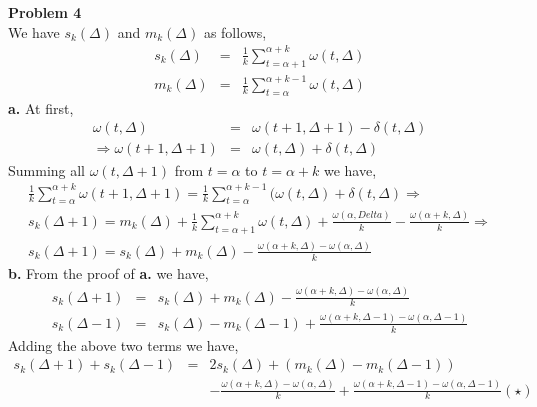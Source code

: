 


\noindent
{\bf Problem 4}\\

We have $s_k(\Delta)$ and $m_k(\Delta)$ as follows,\\
\begin{eqnarray*}
s_k(\Delta) &=& \frac{1}{k}\sum_{t=\alpha+1}^{\alpha+k}\omega(t,\Delta) \\
m_k(\Delta) &=& \frac{1}{k}\sum_{t=\alpha}^{\alpha+k-1}\omega(t,\Delta)
\end{eqnarray*}
{\bf a.} At first,\\
\begin{eqnarray*}
  \omega(t,\Delta) &=& \omega(t+1,\Delta+1) - \delta(t,\Delta) \\
  \Rightarrow \omega(t+1,\Delta+1) &=& \omega(t,\Delta) + \delta(t,\Delta)
\end{eqnarray*}
Summing all $\omega(t, \Delta+1)$ from $t=\alpha$ to $t=\alpha+k$ we have, \\
\begin{eqnarray*}
  \frac{1}{k}\sum_{t=\alpha}^{\alpha+k}\omega(t+1,\Delta+1) = \frac{1}{k}
  \sum_{t=\alpha}^{\alpha+k-1}(\omega(t,\Delta) + \delta(t,\Delta) \Rightarrow \\
  s_k(\Delta+1) = m_k(\Delta) + \frac{1}{k}\sum_{t=\alpha+1}^{\alpha+k}
  \omega(t,\Delta) + \frac{\omega(\alpha, Delta)}{k} - \frac{\omega(\alpha+k,\Delta)}{k} \Rightarrow\\
  s_k(\Delta+1) = s_k(\Delta) + m_k(\Delta) - \frac{\omega(\alpha+k,\Delta)
  -\omega(\alpha, \Delta)}{k}
\end{eqnarray*}
{\bf b.} From the proof of {\bf a.} we have,\\
\begin{eqnarray*}
  s_k(\Delta+1) &=& s_k(\Delta) + m_k(\Delta) - \frac{\omega(\alpha+k,\Delta)
  -\omega(\alpha, \Delta)}{k} \\
  s_k(\Delta-1) &=& s_k(\Delta) - m_k(\Delta-1) + \frac{\omega(\alpha+k,\Delta
  -1) -\omega(\alpha, \Delta-1)}{k}
\end{eqnarray*}
Adding the above two terms we have,\\
\begin{eqnarray*}
  s_k(\Delta+1) + s_k(\Delta-1) &=& 2s_k(\Delta) + (m_k(\Delta) - m_k(\Delta-1))\\
  & & - \frac{\omega(\alpha+k,\Delta) -\omega(\alpha, \Delta)}{k}
  + \frac{\omega(\alpha+k,\Delta -1) -\omega(\alpha, \Delta-1)}{k} (\star)
\end{eqnarray*}
